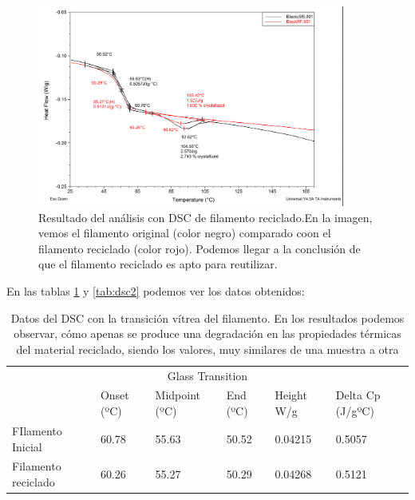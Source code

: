 \begin{figure}[H]
    \centering
    \includegraphics[width=0.9\textwidth]{images/dsc.png}
    \caption[Resultado del análisis con DSC de filamento reciclado.]{Resultado del análisis con DSC de filamento reciclado.En la imagen, vemos el filamento original (color negro) comparado coon el filamento reciclado (color rojo). Podemos llegar a la conclusión de que el filamento reciclado es apto para reutilizar.}
    \label{fig:analisis_dsc}
\end{figure}

En las tablas \ref{tab:dsc1} y \ref{tab:dsc2} podemos ver los datos obtenidos:

\begin{table}[H]
    \centering
    \begin{tabular}{llllll}
        \multicolumn{6}{c}{Glass Transition}                                                        \\
                            & Onset (ºC) & Midpoint (ºC) & End (ºC) & Height W/g & Delta Cp (J/gºC) \\ \hline
        FIlamento Inicial   & 60.78      & 55.63         & 50.52    & 0.04215    & 0.5057           \\
        Filamento reciclado & 60.26      & 55.27         & 50.29    & 0.04268    & 0.5121          
    \end{tabular}
    \caption[Datos del DSC con la transición vítrea del filamento.]{Datos del DSC con la transición vítrea del filamento. En los resultados podemos observar, cómo apenas se produce una degradación en las propiedades térmicas del material reciclado, siendo los valores, muy similares de una muestra a otra}
    \label{tab:dsc1}
\end{table} 


